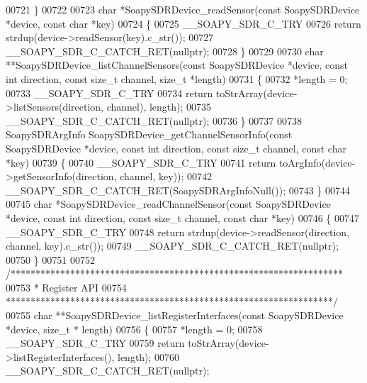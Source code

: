 \begin{DoxyCode}
00721 \}
00722 
00723 \textcolor{keywordtype}{char} *SoapySDRDevice_readSensor(\textcolor{keyword}{const} SoapySDRDevice *device, \textcolor{keyword}{const} \textcolor{keywordtype}{char} *key)
00724 \{
00725     __SOAPY_SDR_C_TRY
00726     \textcolor{keywordflow}{return} strdup(device->readSensor(key).c\_str());
00727     __SOAPY_SDR_C_CATCH_RET(\textcolor{keyword}{nullptr});
00728 \}
00729 
00730 \textcolor{keywordtype}{char} **SoapySDRDevice_listChannelSensors(\textcolor{keyword}{const} SoapySDRDevice *device, \textcolor{keyword}{const} \textcolor{keywordtype}{int} direction, \textcolor{keyword}{const} \textcolor{keywordtype}{size\_t} 
      channel, \textcolor{keywordtype}{size\_t} *length)
00731 \{
00732     *length = 0;
00733     __SOAPY_SDR_C_TRY
00734     \textcolor{keywordflow}{return} toStrArray(device->listSensors(direction, channel), length);
00735     __SOAPY_SDR_C_CATCH_RET(\textcolor{keyword}{nullptr});
00736 \}
00737 
00738 SoapySDRArgInfo SoapySDRDevice_getChannelSensorInfo(\textcolor{keyword}{const} SoapySDRDevice *device, \textcolor{keyword}{const} \textcolor{keywordtype}{int} direction, \textcolor{keyword}{
      const} \textcolor{keywordtype}{size\_t} channel, \textcolor{keyword}{const} \textcolor{keywordtype}{char} *key)
00739 \{
00740     __SOAPY_SDR_C_TRY
00741     \textcolor{keywordflow}{return} toArgInfo(device->getSensorInfo(direction, channel, key));
00742     __SOAPY_SDR_C_CATCH_RET(SoapySDRArgInfoNull());
00743 \}
00744 
00745 \textcolor{keywordtype}{char} *SoapySDRDevice_readChannelSensor(\textcolor{keyword}{const} SoapySDRDevice *device, \textcolor{keyword}{const} \textcolor{keywordtype}{int} direction, \textcolor{keyword}{const} \textcolor{keywordtype}{size\_t} 
      channel, \textcolor{keyword}{const} \textcolor{keywordtype}{char} *key)
00746 \{
00747     __SOAPY_SDR_C_TRY
00748     \textcolor{keywordflow}{return} strdup(device->readSensor(direction, channel, key).c\_str());
00749     __SOAPY_SDR_C_CATCH_RET(\textcolor{keyword}{nullptr});
00750 \}
00751 
00752 \textcolor{comment}{/*******************************************************************}
00753 \textcolor{comment}{ * Register API}
00754 \textcolor{comment}{ ******************************************************************/}
00755 \textcolor{keywordtype}{char} **SoapySDRDevice_listRegisterInterfaces(\textcolor{keyword}{const} SoapySDRDevice *device, \textcolor{keywordtype}{size\_t} *
      length)
00756 \{
00757     *length = 0;
00758     __SOAPY_SDR_C_TRY
00759     \textcolor{keywordflow}{return} toStrArray(device->listRegisterInterfaces(), length);
00760     __SOAPY_SDR_C_CATCH_RET(\textcolor{keyword}{nullptr});

\end{DoxyCode}
